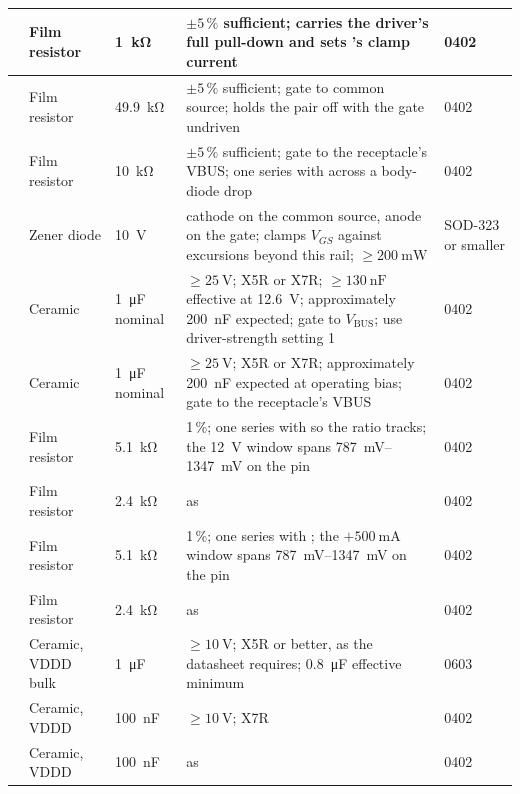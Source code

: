 {\begin{longtable}{|L{0.10\textwidth}|L{0.14\textwidth}|L{0.11\textwidth}|L{0.33\textwidth}|L{0.12\textwidth}|}
\hline
{} & Film resistor & \SI{1}{\kilo\ohm} & $\pm5\,\%$ sufficient; carries the driver's full pull-down and sets 's clamp current & 0402 \\
\hline
{} & Film resistor & \SI{49.9}{\kilo\ohm} & $\pm5\,\%$ sufficient; gate to common source; holds the pair off with the gate undriven & 0402 \\
\hline
{} & Film resistor & \SI{10}{\kilo\ohm} & $\pm5\,\%$ sufficient; gate to the receptacle's VBUS; one series with  across a body-diode drop & 0402 \\
\hline
{} & Zener diode & \SI{10}{\volt} & cathode on the common source, anode on the gate; clamps $V_{GS}$ against excursions beyond this rail; $\geq\SI{200}{\milli\watt}$ & SOD-323 or smaller \\
\hline
{} & Ceramic & \SI{1}{\micro\farad} nominal & $\geq\SI{25}{\volt}$; X5R or X7R; $\geq\SI{130}{\nano\farad}$ effective at \SI{12.6}{\volt}; approximately \SI{200}{\nano\farad} expected; gate to $V_{\mathrm{BUS}}$; use driver-strength setting 1 & 0402 \\
\hline
{} & Ceramic & \SI{1}{\micro\farad} nominal & $\geq\SI{25}{\volt}$; X5R or X7R; approximately \SI{200}{\nano\farad} expected at operating bias; gate to the receptacle's VBUS & 0402 \\
\hline
{} & Film resistor & \SI{5.1}{\kilo\ohm} & 1\,\%; one series with  so the ratio tracks; the \SI{12}{\volt} window spans \SIrange{787}{1347}{\milli\volt} on the pin & 0402 \\
\hline
{} & Film resistor & \SI{2.4}{\kilo\ohm} & as  & 0402 \\
\hline
{} & Film resistor & \SI{5.1}{\kilo\ohm} & 1\,\%; one series with ; the $+\SI{500}{\milli\ampere}$ window spans \SIrange{787}{1347}{\milli\volt} on the pin & 0402 \\
\hline
{} & Film resistor & \SI{2.4}{\kilo\ohm} & as  & 0402 \\
\hline
{} & Ceramic, VDDD bulk & \SI{1}{\micro\farad} & $\geq\SI{10}{\volt}$; X5R or better, as the datasheet requires; \SI{0.8}{\micro\farad} effective minimum & 0603 \\
\hline
{} & Ceramic, VDDD & \SI{100}{\nano\farad} & $\geq\SI{10}{\volt}$; X7R & 0402 \\
\hline
{} & Ceramic, VDDD & \SI{100}{\nano\farad} & as  & 0402 \\

\end{longtable}}
